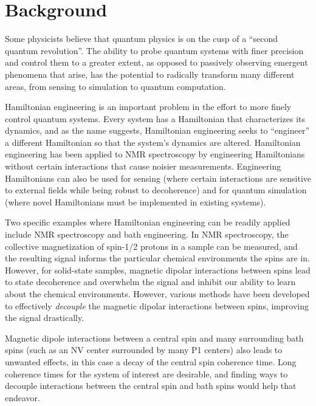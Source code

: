 \chapter{Background}


Some physicists believe that quantum physics is on the cusp of a ``second quantum revolution''.\cite{quantum-rev} The ability to probe quantum systems with finer precision and control them to a greater extent, as opposed to passively observing emergent phenomena that arise, has the potential to radically transform many different areas, from sensing to simulation to quantum computation.

Hamiltonian engineering is an important problem in the effort to more finely control quantum systems.
Every system has a Hamiltonian that characterizes its dynamics, and as the name suggests, Hamiltonian engineering seeks to ``engineer'' a different Hamiltonian so that the system's dynamics are altered. Hamiltonian engineering has been applied to NMR spectroscopy by engineering Hamiltonians without certain interactions that cause noisier measurements. Engineering Hamiltonians can also be used for sensing (where certain interactions are sensitive to external fields while being robust to decoherence) and for quantum simulation (where novel Hamiltonians must be implemented in existing systems).

Two specific examples where Hamiltonian engineering can be readily applied include NMR spectroscopy and bath engineering. In NMR spectroscopy, the collective magnetization of spin-1/2 protons in a sample can be measured, and the resulting signal informs the particular chemical environments the spins are in. However, for solid-state samples, magnetic dipolar interactions between spins lead to state decoherence
and overwhelm the signal and inhibit our ability to learn about the chemical environments. However, various methods have been developed to effectively \emph{decouple} the magnetic dipolar interactions between spins, improving the signal drastically.

Magnetic dipole interactions between a central spin and many surrounding bath spins (such as an NV center surrounded by many P1 centers) also leads to unwanted effects, in this case a decay of the central spin coherence time. Long coherence times for the system of interest are desirable, and finding ways to decouple interactions between the central spin and bath spins would help that endeavor.

